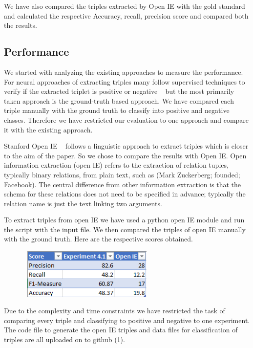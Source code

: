 \documentclass[11pt,letterpaper]{article}
\begin{document}
We have also compared the triples extracted by Open IE with the gold standard and calculated the respective Accuracy, recall, precision score and compared both the results.

\subsection{Performance}

We started with analyzing the existing approaches to measure the performance. For neural approaches of extracting triples many follow supervised techniques to verify if the extracted triplet is positive or negative ~\cite{classification} but the most primarily taken approach is the ground-truth based approach. We have compared each triple manually with the ground truth to classify into positive and negative classes. Therefore we have restricted our evaluation to one approach and compare it with the existing approach. ~\cite{paul_groth,shi_yuan}

Stanford Open IE ~\cite{openIE_extractor} follows a linguistic approach to extract triples which is closer to the aim of the paper. So we chose to compare the results with Open IE. Open information extraction (open IE) refers to the extraction of relation tuples, typically binary relations, from plain text, such as (Mark Zuckerberg; founded; Facebook). The central difference from other information extraction is that the schema for these relations does not need to be specified in advance; typically the relation name is just the text linking two arguments.\newline

To extract triples from open IE we have used a python open IE module and run the script with the input file. We then compared the triples of open IE manually with the ground truth. Here are the respective scores obtained.
\newline

\includegraphics[width=9cm, height=2.5cm]{score.png}\newline

\noindent Due to the complexity and time constraints we have restricted the task of comparing every triple and classifying to positive and negative to one experiment. The code file to generate the open IE triples and data files for classification of triples are all uploaded on to github (1). 
\end{document}
